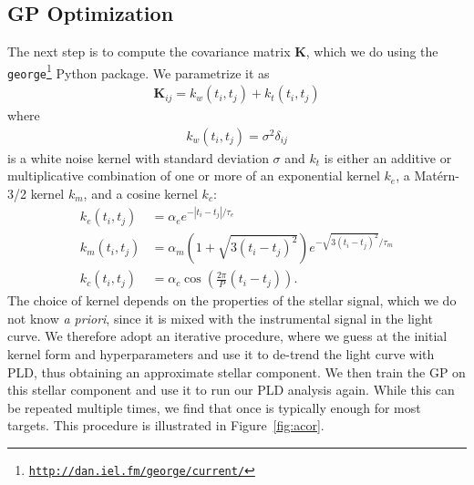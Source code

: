 \documentclass[]{emulateapj}
\begin{document}
\subsection{GP Optimization}
\label{sec:gpopt}
\begin{figure*}[t]
  \begin{center}
    \leavevmode
       \caption{GP optimization procedure for EPIC 201497682. In the top left panel we 
                plot the raw SAP flux (black) and a ten chunk, first order PLD fit
                (red); the residuals are shown in the panel below. These are used to
                compute the power spectrum of the stellar signal (top right), and
                its autocorrelation function (bottom right, black curve). Different
                kernels are then fit to the autocorrelation function, and the one
                with the lowest $\chi^2$ value is chosen for the de-trending step
                (blue curve). The grey envelope about the autocorrelation curve is
                the ad hoc standard error assumed to compute $\chi^2$.
                }
     \label{fig:acor}
  \end{center}
\end{figure*}

The next step is to compute the covariance matrix $\mathbf{K}$, which we do using
the \texttt{george}\footnote{\texttt{\url{http://dan.iel.fm/george/current/}}} Python package. We parametrize 
it as
\begin{align}
\label{eq:covariance}
\mathbf{K}_{ij} = k_w(t_i, t_j) + k_t(t_i, t_j)
\end{align}
where
\begin{align}
\label{eq:whitekernel}
k_w(t_i, t_j) = \sigma^2\delta_{ij}
\end{align}
is a white noise kernel with standard deviation $\sigma$ and $k_t$ is either an 
additive or multiplicative combination
of one or more of an exponential kernel $k_e$, a Mat\'ern-3/2 kernel $k_m$, and
a cosine kernel $k_c$:
\begin{align}
\label{eq:kernels}
k_e(t_i, t_j) &= \alpha_e e^{-\left|t_i - t_j\right|/\tau_e}\nonumber\\
k_m(t_i, t_j) &= \alpha_m \left(1 + \sqrt{3(t_i - t_j)^2}\right) e^{-\sqrt{3(t_i - t_j)^2}/\tau_m}\nonumber\\ 
k_c(t_i, t_j) &= \alpha_c \cos{\left(\frac{2\pi}{P}(t_i - t_j)\right)}.
\end{align}
The choice of kernel depends on the properties of the stellar signal, which we do
not know \emph{a priori}, since it is mixed with the instrumental signal in the
light curve. We therefore adopt an iterative procedure, where we guess at the initial
kernel form and hyperparameters and use it to de-trend the light curve with PLD, thus
obtaining an approximate stellar component. We then train the GP on this stellar
component and use it to run our PLD analysis again. While this can be repeated
multiple times, we find that once is typically enough for most targets. This procedure
is illustrated in Figure~\ref{fig:acor}.
\end{document}
